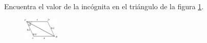 Encuentra el valor de la incógnita en el triángulo de la figura \ref{fig:angle_triangle_17}.

\begin{minipage}[t][][t]{0.35\textwidth}
    \begin{figure}[H]
\centering
            \includegraphics[width=0.15\textwidth]{../images/angle_triangle_17.png}

        \caption{}
        \label{fig:angle_triangle_17}
    \end{figure}
\end{minipage}\hfill
\begin{minipage}[t][][t]{0.6\textwidth}
    \begin{solutionbox}{4.5cm}

    \end{solutionbox}
\end{minipage}
